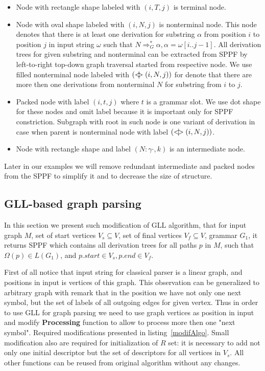 \begin{itemize}
    \item Node with rectangle shape labeled with $(i, T, j)$ is terminal node.     
    \item Node with oval shape labeled with $(i, N, j)$ is nonterminal node. 
    This node denotes that there is at least one derivation for substring $\alpha$ from position $i$ to position $j$ in input string $\omega$ such that $N \Rightarrow^*_G \alpha, \alpha = \omega[i..j-1] $.
    All derivation trees for given substring and nonterminal can be extracted from SPPF by left-to-right top-down graph traversal started from respective node. 
    We use filled nonterminal node labeled with $(<\mkern-11mu | \mkern-11mu> (i, N, j))$ for denote that there are more then one derivations from nonterminal $N$ for substring from $i$ to $j$.
    \item Packed node with label $(i,t,j)$ where $t$ is a grammar slot. We use dot shape for these nodes and omit label because it is important only for SPPF constriction.
    Subgraph with root in such node is one variant of derivation in case when parent is nonterminal node with label $(<\mkern-9mu | \mkern-9mu> (i, N, j))$.
    \item Node with rectangle shape and label $(N : \gamma \cdot, k)$ is an intermediate node.
\end{itemize}

Later in our examples we will remove redundant intermediate and packed nodes from the SPPF to simplify it and to decrease the size of structure.

\subsection{GLL-based graph parsing}

In this section we present such modification of GLL algorithm, that for input graph $M$, set of start vertices $V_s\subseteq V$, set of final vertices $V_f\subseteq V$, grammar $G_1$, it returns SPPF which contains all derivation trees for all paths $p$ in $M$, such that $\Omega(p) \in L(G_1)$, and $p.start \in V_s, p.end \in V_f$.

First of all notice that input string for classical parser is a linear graph, and positions in input is vertices of this graph.
This observation can be generalized to arbitrary graph with remark that in the position we have not only one next symbol, but the set of labels of all outgoing edges for given vertex. 
Thus in order to use GLL for graph parsing we need to use graph vertices as position in input and modify \textbf{Processing} function to allow to process more then one "next symbol".
Required modifications presented in listing~\ref{modifAlgo}.
Small modification also are required for initialization of $R$ set: it is necessary to add not only one initial descriptor but the set of descriptors for all vertices in $V_s$.
All other functions can be reused from original algorithm without any changes.

